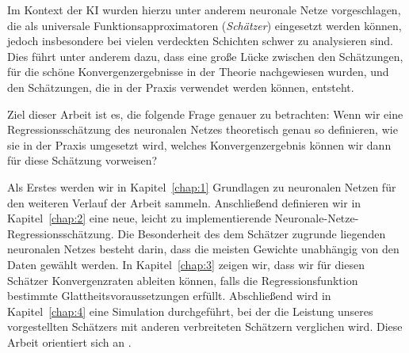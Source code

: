 Im Kontext der KI wurden hierzu unter anderem neuronale Netze vorgeschlagen, die als universale Funktionsapproximatoren (\emph{Schätzer}) eingesetzt werden können, jedoch insbesondere bei vielen verdeckten Schichten schwer zu analysieren sind. 
Dies führt unter anderem dazu, dass eine große Lücke zwischen den Schätzungen, für die schöne Konvergenzergebnisse in der Theorie nachgewiesen wurden, und den Schätzungen, die in der Praxis verwendet werden können, entsteht.

Ziel dieser Arbeit ist es, die folgende Frage genauer zu betrachten: Wenn wir eine Regressionsschätzung des neuronalen Netzes theoretisch genau so definieren, wie sie in der Praxis umgesetzt wird, welches Konvergenzergebnis können wir dann für diese Schätzung vorweisen? 

Als Erstes werden wir in Kapitel~\ref{chap:1} Grundlagen zu neuronalen Netzen für den weiteren Verlauf der Arbeit sammeln.
Anschließend definieren wir in Kapitel~\ref{chap:2} eine neue, leicht zu implementierende Neuronale-Netze-Regressionsschätzung. Die Besonderheit des dem Schätzer zugrunde liegenden neuronalen Netzes besteht darin, dass die meisten Gewichte unabhängig von den Daten gewählt werden.
In Kapitel~\ref{chap:3} zeigen wir, dass wir für diesen Schätzer Konvergenzraten ableiten können, falls die Regressionsfunktion bestimmte Glattheitsvoraussetzungen erfüllt. 
Abschließend wird in Kapitel~\ref{chap:4} eine Simulation durchgeführt, bei der die Leistung unseres vorgestellten Schätzers mit anderen verbreiteten Schätzern verglichen wird. Diese Arbeit orientiert sich an \cite{kohler19}.
